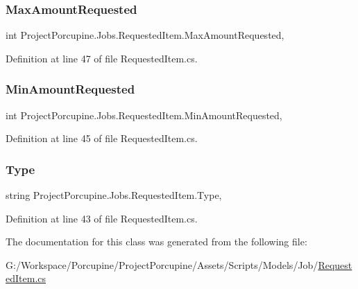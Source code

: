 \subsubsection{\texorpdfstring{Max\+Amount\+Requested}{MaxAmountRequested}}
{\footnotesize\ttfamily int Project\+Porcupine.\+Jobs.\+Requested\+Item.\+Max\+Amount\+Requested\hspace{0.3cm}{\ttfamily [get]}, {\ttfamily [set]}}



Definition at line 47 of file Requested\+Item.\+cs.

\mbox{\label{class_project_porcupine_1_1_jobs_1_1_requested_item_a2903d0004c22e2b46b42286658910908}} 
\subsubsection{\texorpdfstring{Min\+Amount\+Requested}{MinAmountRequested}}
{\footnotesize\ttfamily int Project\+Porcupine.\+Jobs.\+Requested\+Item.\+Min\+Amount\+Requested\hspace{0.3cm}{\ttfamily [get]}, {\ttfamily [set]}}



Definition at line 45 of file Requested\+Item.\+cs.

\mbox{\label{class_project_porcupine_1_1_jobs_1_1_requested_item_a0bf2e8304b2300a94733dd8849cfc18f}} 
\subsubsection{\texorpdfstring{Type}{Type}}
{\footnotesize\ttfamily string Project\+Porcupine.\+Jobs.\+Requested\+Item.\+Type\hspace{0.3cm}{\ttfamily [get]}, {\ttfamily [set]}}



Definition at line 43 of file Requested\+Item.\+cs.



The documentation for this class was generated from the following file\+:\begin{DoxyCompactItemize}
\item 
G\+:/\+Workspace/\+Porcupine/\+Project\+Porcupine/\+Assets/\+Scripts/\+Models/\+Job/\hyperlink{_requested_item_8cs}{Requested\+Item.\+cs}\end{DoxyCompactItemize}
